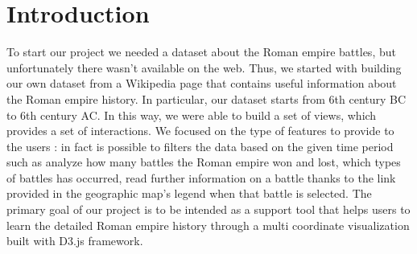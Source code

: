 \section{Introduction}
To start our project we needed a dataset about the Roman empire battles, but unfortunately there wasn't available on the web. Thus, we started with building our own dataset from a Wikipedia page that contains useful information about the Roman empire history. In particular, our dataset starts from 6th century BC to 6th century AC. In this way, we were able to build a set of views, which provides a set of interactions. We focused on the type of features to provide to the users : in fact is possible to filters the data based on the given time period such as analyze how many battles the Roman empire won and lost, which types of battles has occurred, read further information on a battle thanks to the link provided in the geographic map's legend when that battle is selected. The primary goal of our project is to be intended as a support tool that helps users to learn the detailed Roman empire history through a multi coordinate visualization built with D3.js framework.